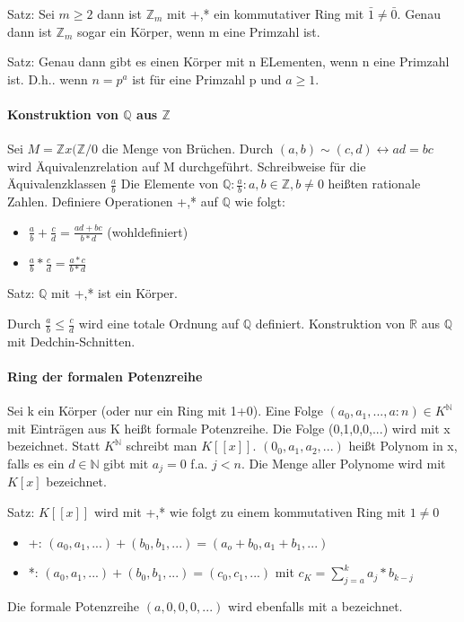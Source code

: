 \documentclass[a4paper]{article}
\begin{document}
\begin{multicols}{3}
    Satz: Sei $m\geq 2$ dann ist $\mathbb{Z}_m$ mit +,* ein kommutativer Ring mit $\bar{1}\not=\bar{0}$. Genau dann ist $\mathbb{Z}_m$ sogar ein Körper, wenn m eine Primzahl ist.
    
    Satz: Genau dann gibt es einen Körper mit n ELementen, wenn n eine Primzahl ist. D.h.. wenn $n=p^a$ ist für eine Primzahl p und $a\geq 1$.
    
    \paragraph{Konstruktion von $\mathbb{Q}$ aus $\mathbb{Z}$}
    Sei $M=\mathbb{Z} x(\mathbb{Z} /{0}$ die Menge von Brüchen. Durch $(a,b)\sim (c,d)\leftrightarrow ad=bc$ wird Äquivalenzrelation auf M durchgeführt. Schreibweise für die Äquivalenzklassen $\frac{a}{b}$ Die Elemente von $\mathbb{Q} :{\frac{a}{b}:a,b\in\mathbb{Z}, b\not=0}$ heißten rationale Zahlen.
    Definiere Operationen +,* auf $\mathbb{Q}$ wie folgt:
    \begin{itemize}
        \item $\frac{a}{b}+\frac{c}{d} = \frac{ad+bc}{b*d}$ (wohldefiniert)
        \item $\frac{a}{b}*\frac{c}{d} = \frac{a*c}{b*d}$
    \end{itemize}
    
    Satz: $\mathbb{Q}$ mit +,* ist ein Körper.
    
    Durch $\frac{a}{b}\leq\frac{c}{d}$ wird eine totale Ordnung auf $\mathbb{Q}$ definiert. Konstruktion von $\mathbb{R}$ aus $\mathbb{Q}$ mit Dedchin-Schnitten.
    
    \paragraph{Ring der formalen Potenzreihe}
    Sei k ein Körper (oder nur ein Ring mit 1+0). Eine Folge $(a_0, a_1,...,a:n)\in K^{\mathbb{N}}$ mit Einträgen aus K heißt formale Potenzreihe. Die Folge (0,1,0,0,...) wird mit x bezeichnet. Statt $K^{\mathbb{N}}$ schreibt man $K[[x]]$. $(0_0,a_1,a_2,...)$ heißt Polynom in x, falls es ein $d\in \mathbb{N}$ gibt mit $a_j=0$ f.a. $j<n$. Die Menge aller Polynome wird mit $K[x]$ bezeichnet.
    
    Satz: $K[[x]]$ wird mit +,* wie folgt zu einem kommutativen Ring mit $1\not=0$
    \begin{itemize}
        \item +: $(a_0,a_1,...) + (b_0,b_1,...) = (a_o+b_0, a_1+b_1, ...)$
        \item *: $(a_0,a_1,...) + (b_0,b_1,...) = (c_0, c_1,...)$ mit $c_K=\sum_{j=a}^{k} a_j*b_{k-j}$
    \end{itemize}
    Die formale Potenzreihe $(a,0,0,0,...)$ wird ebenfalls mit a bezeichnet.
    

\end{multicols}
\end{document}
